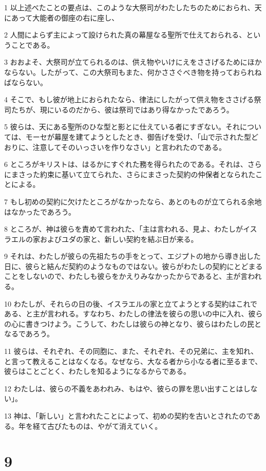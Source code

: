 \par 1 以上述べたことの要点は、このような大祭司がわたしたちのためにおられ、天にあって大能者の御座の右に座し、
\par 2 人間によらず主によって設けられた真の幕屋なる聖所で仕えておられる、ということである。
\par 3 おおよそ、大祭司が立てられるのは、供え物やいけにえをささげるためにほかならない。したがって、この大祭司もまた、何かささぐべき物を持っておられねばならない。
\par 4 そこで、もし彼が地上におられたなら、律法にしたがって供え物をささげる祭司たちが、現にいるのだから、彼は祭司ではあり得なかったであろう。
\par 5 彼らは、天にある聖所のひな型と影とに仕えている者にすぎない。それについては、モーセが幕屋を建てようとしたとき、御告げを受け、「山で示された型どおりに、注意してそのいっさいを作りなさい」と言われたのである。
\par 6 ところがキリストは、はるかにすぐれた務を得られたのである。それは、さらにまさった約束に基いて立てられた、さらにまさった契約の仲保者となられたことによる。
\par 7 もし初めの契約に欠けたところがなかったなら、あとのものが立てられる余地はなかったであろう。
\par 8 ところが、神は彼らを責めて言われた、「主は言われる、見よ、わたしがイスラエルの家およびユダの家と、新しい契約を結ぶ日が来る。
\par 9 それは、わたしが彼らの先祖たちの手をとって、エジプトの地から導き出した日に、彼らと結んだ契約のようなものではない。彼らがわたしの契約にとどまることをしないので、わたしも彼らをかえりみなかったからであると、主が言われる。
\par 10 わたしが、それらの日の後、イスラエルの家と立てようとする契約はこれである、と主が言われる。すなわち、わたしの律法を彼らの思いの中に入れ、彼らの心に書きつけよう。こうして、わたしは彼らの神となり、彼らはわたしの民となるであろう。
\par 11 彼らは、それぞれ、その同胞に、また、それぞれ、その兄弟に、主を知れ、と言って教えることはなくなる。なぜなら、大なる者から小なる者に至るまで、彼らはことごとく、わたしを知るようになるからである。
\par 12 わたしは、彼らの不義をあわれみ、もはや、彼らの罪を思い出すことはしない」。
\par 13 神は、「新しい」と言われたことによって、初めの契約を古いとされたのである。年を経て古びたものは、やがて消えていく。

\chapter{9}

